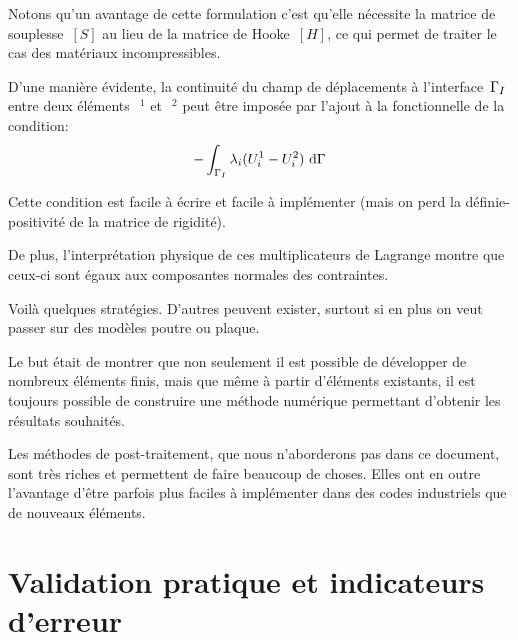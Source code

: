 \begin{description}
	Notons qu'un avantage de cette formulation c'est qu'elle nécessite la matrice de souplesse~$[S]$ au lieu de la matrice de Hooke~$[H]$, ce qui permet de traiter le cas des matériaux incompressibles. 
	
	\item[\textcolorblue{Multiplicateurs de Lagrange:}]
	
	D'une manière évidente, la continuité du champ de déplacements 	à l'interface~$\Gamma_I$ entre deux éléments~$~^1$ et~$~^2$ peut être imposée par l'ajout à la fonctionnelle de la condition: 
	\begin{equation} -\dint_{\li} \lambda_i(U_i^1-U_i^2)\ \dd\Gamma \end{equation}

	Cette condition est facile à écrire et facile à implémenter (mais on perd la 	définie-positivité de la matrice de rigidité).
	
	De plus, l'interprétation physique de ces multiplicateurs de Lagrange montre 	que ceux-ci sont égaux aux composantes normales des contraintes.
\end{description}
\medskip
Voilà quelques stratégies. D'autres peuvent exister, surtout si en plus on veut passer sur des modèles poutre ou plaque.

Le but était de montrer que non seulement il est possible de développer de nombreux éléments finis, mais que même à partir d'éléments existants, il est toujours possible de construire une méthode numérique permettant d'obtenir les résultats souhaités.

Les méthodes de post-traitement, que nous n'aborderons pas dans ce document, sont très riches et permettent de faire beaucoup de choses. Elles ont en outre l'avantage d'être parfois plus faciles à implémenter dans des codes industriels que de nouveaux éléments.

\medskip
\section{Validation pratique et indicateurs d'erreur}\label{Sec-ValidEF}

